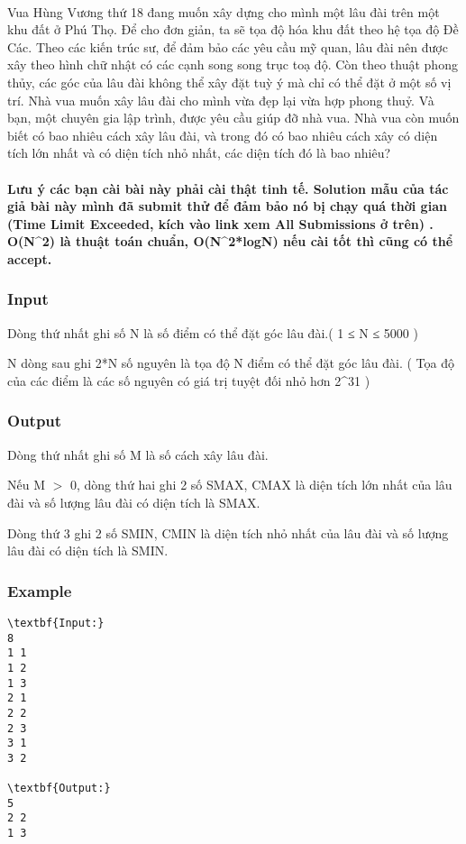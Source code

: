 

 

Vua Hùng Vương thứ 18 đang muốn xây dựng cho mình một lâu đài trên một khu đất ở Phú Thọ. Để cho đơn giản, ta sẽ tọa độ hóa khu đất theo hệ tọa độ Đề Các. Theo các kiến trúc sư, để đảm bảo các yêu cầu mỹ quan, lâu đài nên được xây theo hình chữ nhật có các cạnh song song trục toạ độ. Còn theo thuật phong thủy, các góc của lâu đài không thể xây đặt tuỳ ý mà chỉ có thể đặt ở một số vị trí. Nhà vua muốn xây lâu đài cho mình vừa đẹp lại vừa hợp phong thuỷ. Và bạn, một chuyên gia lập trình, được yêu cầu giúp đỡ nhà vua. Nhà vua còn muốn biết có bao nhiêu cách xây lâu đài, và trong đó có bao nhiêu cách xây có diện tích lớn nhất và có diện tích nhỏ nhất, các diện tích đó là bao nhiêu?

\paragraph{Lưu ý các bạn cài bài này phải cài thật tinh tế. Solution mẫu của tác giả bài này mình đã submit thử để đảm bảo nó bị chạy quá thời gian (Time Limit Exceeded, kích vào link xem All Submissions ở trên) . O(N^2) là thuật toán chuẩn, O(N^2*logN) nếu cài tốt thì cũng có thể accept.}

\subsubsection{Input}

Dòng thứ nhất ghi số N là số điểm có thể đặt góc lâu đài.( 1 ≤ N ≤ 5000 )


N dòng sau ghi 2*N số nguyên là tọa độ N điểm có thể đặt góc lâu đài. ( Tọa độ của các điểm là các số nguyên có giá trị tuyệt đối nhỏ hơn 2^31 )

\subsubsection{Output}

Dòng thứ nhất ghi số M là số cách xây lâu đài.


Nếu M $>$ 0, dòng thứ hai ghi 2 số SMAX, CMAX là diện tích lớn nhất của lâu đài và số lượng lâu đài có diện tích là SMAX.


Dòng thứ 3 ghi 2 số SMIN, CMIN là diện tích nhỏ nhất của lâu đài và số lượng lâu đài có diện tích là SMIN.

\subsubsection{Example}
\begin{verbatim}
\textbf{Input:}
8
1 1
1 2
1 3
2 1
2 2
2 3
3 1
3 2

\textbf{Output:}
5
2 2
1 3

\end{verbatim}
